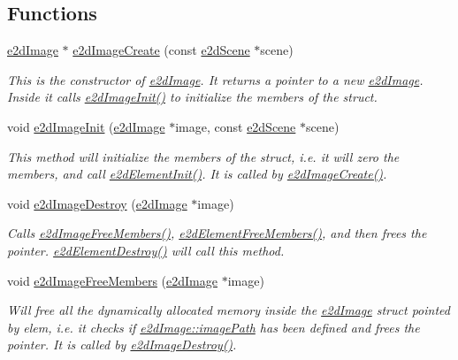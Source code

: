 \subsection*{Functions}
\begin{DoxyCompactItemize}
\item 
\hyperlink{structe2dImage}{e2d\-Image} $\ast$ \hyperlink{group__e2dImage_gafc7e085a237f8d2f1b147b3cca8259d6}{e2d\-Image\-Create} (const \hyperlink{structe2dScene}{e2d\-Scene} $\ast$scene)
\begin{DoxyCompactList}\small\item\em This is the constructor of \hyperlink{structe2dImage}{e2d\-Image}. It returns a pointer to a new \hyperlink{structe2dImage}{e2d\-Image}. Inside it calls \hyperlink{group__e2dImage_ga11703b45867fb00d56489a3a6bc6bb9c}{e2d\-Image\-Init()} to initialize the members of the struct. \end{DoxyCompactList}\item 
void \hyperlink{group__e2dImage_ga11703b45867fb00d56489a3a6bc6bb9c}{e2d\-Image\-Init} (\hyperlink{structe2dImage}{e2d\-Image} $\ast$image, const \hyperlink{structe2dScene}{e2d\-Scene} $\ast$scene)
\begin{DoxyCompactList}\small\item\em This method will initialize the members of the struct, i.\-e. it will zero the members, and call \hyperlink{group__e2dElement_ga8734d10ef40a380dfc51bfe1790a92a7}{e2d\-Element\-Init()}. It is called by \hyperlink{group__e2dImage_gafc7e085a237f8d2f1b147b3cca8259d6}{e2d\-Image\-Create()}. \end{DoxyCompactList}\item 
void \hyperlink{group__e2dImage_gacf174e48578f0e23888e37f47a3ef10b}{e2d\-Image\-Destroy} (\hyperlink{structe2dImage}{e2d\-Image} $\ast$image)
\begin{DoxyCompactList}\small\item\em Calls \hyperlink{group__e2dImage_gaf5409c0b10e8a8d8b9bd3f08e1d5da1f}{e2d\-Image\-Free\-Members()}, \hyperlink{group__e2dElement_gae8da5104d70a09549ca74044dda8313c}{e2d\-Element\-Free\-Members()}, and then frees the pointer. \hyperlink{group__e2dElement_ga214c437a16fe6f3fc795539f851a2019}{e2d\-Element\-Destroy()} will call this method. \end{DoxyCompactList}\item 
void \hyperlink{group__e2dImage_gaf5409c0b10e8a8d8b9bd3f08e1d5da1f}{e2d\-Image\-Free\-Members} (\hyperlink{structe2dImage}{e2d\-Image} $\ast$image)
\begin{DoxyCompactList}\small\item\em Will free all the dynamically allocated memory inside the \hyperlink{structe2dImage}{e2d\-Image} struct pointed by elem, i.\-e. it checks if \hyperlink{structe2dImage_afb14ab23ba86115c3b01ad4122943f89}{e2d\-Image\-::image\-Path} has been defined and frees the pointer. It is called by \hyperlink{group__e2dImage_gacf174e48578f0e23888e37f47a3ef10b}{e2d\-Image\-Destroy()}. \end{DoxyCompactList}\item 

\end{DoxyCompactItemize}
